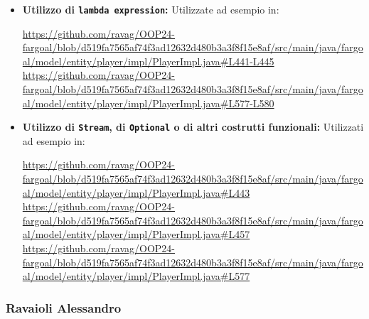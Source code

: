 \documentclass{report}
\begin{document}
\begin{itemize}
    \item \textbf{Utilizzo di \texttt{lambda expression}:}\newline
    Utilizzate ad esempio in:
    \begin{sloppypar}
        \url{https://github.com/ravag/OOP24-fargoal/blob/d519fa7565af74f3ad12632d480b3a3f8f15e8af/src/main/java/fargoal/model/entity/player/impl/PlayerImpl.java#L441-L445}\newline
        \url{https://github.com/ravag/OOP24-fargoal/blob/d519fa7565af74f3ad12632d480b3a3f8f15e8af/src/main/java/fargoal/model/entity/player/impl/PlayerImpl.java#L577-L580}
    \end{sloppypar}
    \item \textbf{Utilizzo di \texttt{Stream}, di \texttt{Optional} o di altri costrutti funzionali:}\newline
    Utilizzati ad esempio in:
    \begin{sloppypar}
        \url{https://github.com/ravag/OOP24-fargoal/blob/d519fa7565af74f3ad12632d480b3a3f8f15e8af/src/main/java/fargoal/model/entity/player/impl/PlayerImpl.java#L443}\newline
        \url{https://github.com/ravag/OOP24-fargoal/blob/d519fa7565af74f3ad12632d480b3a3f8f15e8af/src/main/java/fargoal/model/entity/player/impl/PlayerImpl.java#L457}\newline
        \url{https://github.com/ravag/OOP24-fargoal/blob/d519fa7565af74f3ad12632d480b3a3f8f15e8af/src/main/java/fargoal/model/entity/player/impl/PlayerImpl.java#L577}
    \end{sloppypar}
\end{itemize}

\subsubsection{Ravaioli Alessandro}
\end{document}
